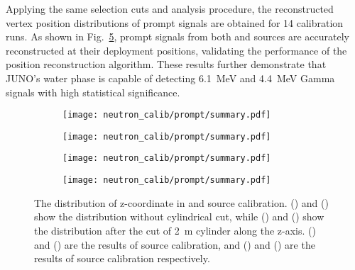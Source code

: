 Applying the same selection cuts and analysis procedure, the reconstructed vertex position distributions of prompt signals are obtained for 14 calibration runs.
As shown in Fig.~\ref{fig:promptSummary}, prompt signals from both  and  sources are accurately reconstructed at their deployment positions, validating the performance of the position reconstruction algorithm.
These results further demonstrate that JUNO's water phase is capable of detecting \SI{6.1}{MeV} and \SI{4.4}{MeV} Gamma signals with high statistical significance.
\begin{figure}[htbp]
	\centering
	\begin{subfigure}{0.5\textwidth}
		\centering
		\texttt{[image: neutron\_calib/prompt/summary.pdf]}
		\caption{}
		\label{fig:AmC_all}
	\end{subfigure}%
	\begin{subfigure}{0.5\textwidth}
		\centering
		\texttt{[image: neutron\_calib/prompt/summary.pdf]}
		\caption{}
		\label{fig:AmC_2m}
	\end{subfigure}
	\begin{subfigure}{0.5\textwidth}
		\centering
		\texttt{[image: neutron\_calib/prompt/summary.pdf]}
		\caption{}
		\label{fig:AmBe_all}
	\end{subfigure}%
	\begin{subfigure}{0.5\textwidth}
		\centering
		\texttt{[image: neutron\_calib/prompt/summary.pdf]}
		\caption{}
		\label{fig:AmBe_2m}
	\end{subfigure}
	\caption{The distribution of z-coordinate in  and  source calibration. () and () show the distribution without cylindrical cut, while () and () show the distribution after the cut of \SI{2}{m} cylinder along the z-axis. () and () are the results of  source calibration, and () and () are the results of  source calibration respectively.}
	\label{fig:promptSummary}
\end{figure}

